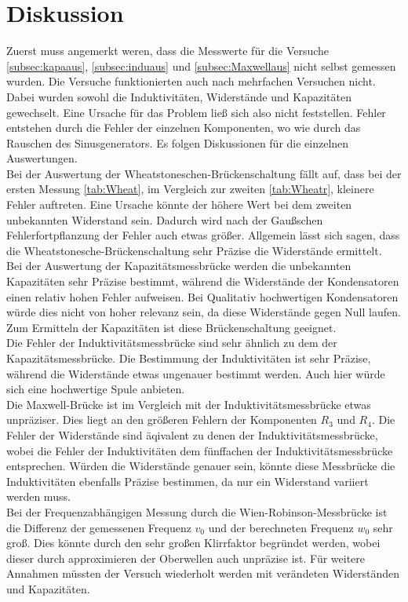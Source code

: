 \section{Diskussion}
\label{sec:Diskussion}
Zuerst muss angemerkt weren, dass die Messwerte für die Versuche \ref{subsec:kapaaus}, \ref{subsec:induaus} und \ref{subsec:Maxwellaus} nicht selbst gemessen wurden.
Die Versuche funktionierten auch nach mehrfachen Versuchen nicht. Dabei wurden sowohl die Induktivitäten, Widerstände und Kapazitäten gewechselt.
Eine Ursache für das Problem ließ sich also nicht feststellen.
Fehler entstehen durch die Fehler der einzelnen Komponenten, wo wie durch das Rauschen des Sinusgenerators.
Es folgen Diskussionen für die einzelnen Auswertungen.\\
Bei der Auswertung der Wheatstoneschen-Brückenschaltung fällt auf, dass bei der ersten Messung \ref{tab:Wheat}, im Vergleich zur zweiten \ref{tab:Wheatr}, kleinere Fehler auftreten.
Eine Ursache könnte der höhere Wert bei dem zweiten unbekannten Widerstand sein. Dadurch wird nach der Gaußschen Fehlerfortpflanzung
der Fehler auch etwas größer.
Allgemein lässt sich sagen, dass die Wheatstonesche-Brückenschaltung sehr Präzise die Widerstände ermittelt.\\
Bei der Auswertung der Kapazitätsmessbrücke werden die unbekannten Kapazitäten sehr Präzise bestimmt, während die Widerstände der Kondensatoren einen relativ hohen Fehler aufweisen.
Bei Qualitativ hochwertigen Kondensatoren würde dies nicht von hoher relevanz sein, da diese Widerstände gegen Null laufen.
Zum Ermitteln der Kapazitäten ist diese Brückenschaltung geeignet. \\
Die Fehler der Induktivitätsmessbrücke sind sehr ähnlich zu dem der Kapazitätsmessbrücke.
Die Bestimmung der Induktivitäten ist sehr Präzise, während die Widerstände etwas ungenauer bestimmt werden.
Auch hier würde sich eine hochwertige Spule anbieten.\\
Die Maxwell-Brücke ist im Vergleich mit der Induktivitätsmessbrücke etwas unpräziser.
Dies liegt an den größeren Fehlern der Komponenten $R_3$ und $R_4$. 
Die Fehler der Widerstände sind äqivalent zu denen der Induktivitätsmessbrücke, wobei die Fehler der Induktivitäten dem fünffachen der
Induktivitätsmessbrücke entsprechen. Würden die Widerstände genauer sein, könnte diese Messbrücke die Induktivitäten ebenfalls Präzise bestimmen, 
da nur ein Widerstand variiert werden muss.\\
Bei der Frequenzabhängigen Messung durch die Wien-Robinson-Messbrücke ist die Differenz der gemessenen Frequenz $v_0$ und der berechneten Frequenz $w_0$ sehr groß.
Dies könnte durch den sehr großen Klirrfaktor begründet werden, wobei dieser durch approximieren der Oberwellen auch unpräzise ist.
Für weitere Annahmen müssten der Versuch wiederholt werden mit verändeten Widerständen und Kapazitäten.

